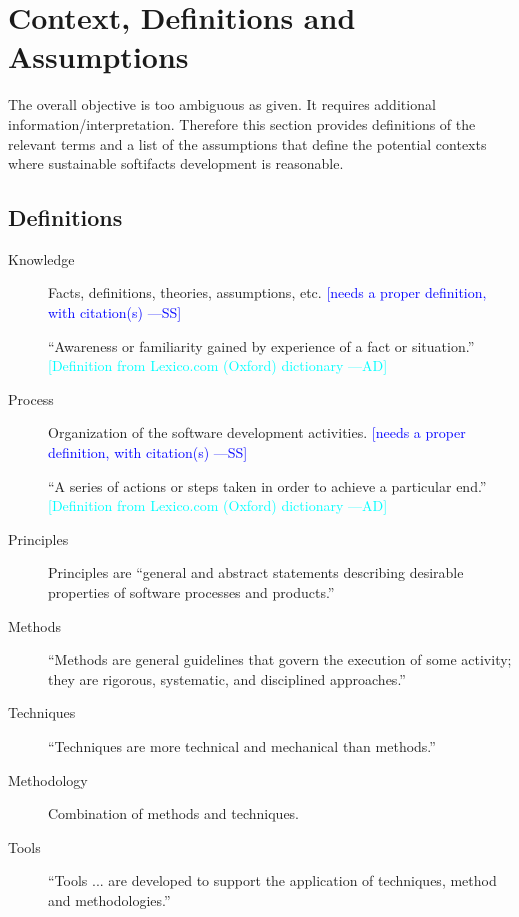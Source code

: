 \documentclass[12pt]{article}
\newcommand{\authornote}[3]{\textcolor{#1}{[#3 ---#2]}}
\newcommand{\authornote}[3]{}
\newcommand{\wss}[1]{\authornote{blue}{SS}{#1}} %
\newcommand{\ad}[1]{\authornote{cyan}{AD}{#1}} %
\begin{document}
\section {Context, Definitions and Assumptions} \label{Sec_Context}

The overall objective is too ambiguous as given.  It requires additional
information/interpretation.  Therefore this section provides definitions of the
relevant terms and a list of the assumptions that define the potential contexts
where sustainable softifacts development is reasonable.

\subsection{Definitions}

\begin{description}
\item[Knowledge] Facts, definitions, theories, assumptions, etc. \wss{needs a
    proper definition, with citation(s)}

``Awareness or familiarity gained by experience of a fact or situation.'' \citep{OxfordKnowledge2020}
\ad{Definition from Lexico.com (Oxford) dictionary}

\item[Process] Organization of the software development activities.  \wss{needs a
    proper definition, with citation(s)}

``A series of actions or steps taken in order to achieve a particular end.''\citep{OxfordProcess2020}
\ad{Definition from Lexico.com (Oxford) dictionary}

\item[Principles] Principles are ``general and abstract statements describing
  desirable properties of software processes and products.''  \citep[p.\
  41]{GhezziEtAl2003}
\item[Methods] ``Methods are general guidelines that govern the execution of some activity;
  they are rigorous, systematic, and disciplined approaches.''  \citep[p.\
  41]{GhezziEtAl2003}
\item[Techniques] ``Techniques are more technical and mechanical than methods.''
  \cite[p.\ 41]{GhezziEtAl2003}
\item[Methodology] Combination of methods and techniques.  \citep[p.\
  41]{GhezziEtAl2003}
\item[Tools] ``Tools ... are developed to support the application of techniques,
  method and methodologies.'' \cite[p.\ 41]{GhezziEtAl2003}


\end{description}
\end{document}
